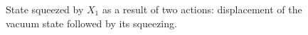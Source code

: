 \begin{figure}
\centering



\caption{State squeezed by $X_1$ as a result of two actions:
  displacement of the vacuum state followed by its squeezing.}
\label{figPart3Squeezed_7}
\end{figure}